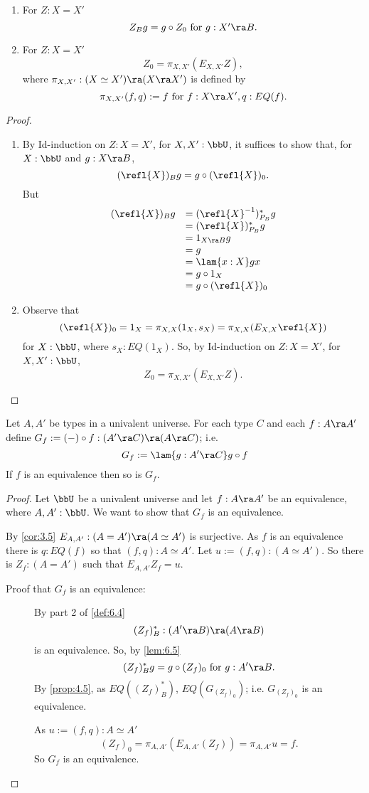 \begin{lem} $\;$\label{lem:6.5}
\begin{enumerate}
\item For $Z:X=X'$ 
  \[ Z_Bg = g\circ Z_0 \mbox{ for $g:X'\ra B$}.\]
\item For $Z:X=X'$
  \[ Z_0 = \pi_{X,X'}(E_{X,X'}Z),\] 
where $\pi_{X,X'}:(X\simeq X')\ra (X\ra X')$ is defined by
  \[ \pi_{X,X'}(f,q):=f\mbox{ for } f:X\ra X', q:EQ(f).\]
\end{enumerate}
\end{lem}
\begin{proof}
\begin{enumerate}
\item By Id-induction on $Z:X=X'$, for $X,X':\bbU$, it suffices to show that, for $X:\bbU$ and $g:X\ra B$,
  \[ (\refl{X})_Bg = g\circ(\refl{X})_0.\]
But
  \[\begin{array}{ll}
(\refl{X})_Bg 
&= (\refl{X}^{-1})_{P_B}^*g\\
&= (\refl{X})_{P_B}^*g\\
&= 1_{X\ra B}g\\
&= g\\
&= \lam{x:X}gx\\
&= g\circ 1_X\\
&= g\circ (\refl{X})_0
\end{array}\]
\item Observe that 
  \[(\refl{X})_0=1_X=\pi_{X,X}(1_X,s_X)=\pi_{X,X}(E_{X,X}\refl{X})\]
for $X:\bbU$, where $s_X:EQ(1_X)$.  So, by Id-induction on $Z:X=X'$, for 
$X,X':\bbU$,
  \[ Z_0 = \pi_{X,X'}(E_{X,X'}Z).\]
\end{enumerate}
\end{proof}

\begin{lem}\label{fe:lem-main2}\label{lem:6.6}
Let $A,A'$ be types in a univalent universe.  For each type $C$ and each
$f:A\ra A'$ define
$G_f := (-)\circ f:(A'\ra C)\ra (A\ra C)$;
i.e.
  \[ G_f := \lam{g:A'\ra C} g\circ f\]
 If $f$ is an equivalence then so is $G_f$.
\end{lem}
\begin{proof} Let $\bbU$ be a univalent universe and let $f:A\ra A'$ be an 
equivalence, where $A,A':\bbU$.  We want to show that $G_f$ is an equivalence.

By \autoref{cor:3.5} $E_{A,A'}:(A=A')\ra (A\simeq A')$ is surjective.  
As $f$ is an equivalence there is $q:EQ(f)$ so that $(f,q):A\simeq A'$. Let $u:=(f,q):(A\simeq A')$.  So there is $Z_f:(A=A')$ such that $E_{A,A'}Z_f = u$.

\begin{description}
\item[Proof that $G_f$ is an equivalence:]
By part 2 of \autoref{def:6.4} 
  \[ (Z_f)_B^*:(A'\ra B)\ra (A\ra B)\]
is an equivalence.  So, by \autoref{lem:6.5}
  \[(Z_f)_B^*g = g\circ (Z_f)_0\mbox{ for } g:A'\ra B.\]
By \autoref{prop:4.5}, as $EQ((Z_f)_B^*)$, $EQ(G_{(Z_f)_0})$; i.e. $G_{(Z_f)_0}$ is an equivalence.

As $u:=(f,q):A\simeq A'$
  \[(Z_f)_0 = \pi_{A,A'}(E_{A,A'}(Z_f)) =\pi_{A,A'}u = f.\]
So $G_f$ is an equivalence.
\end{description}
\end{proof}


